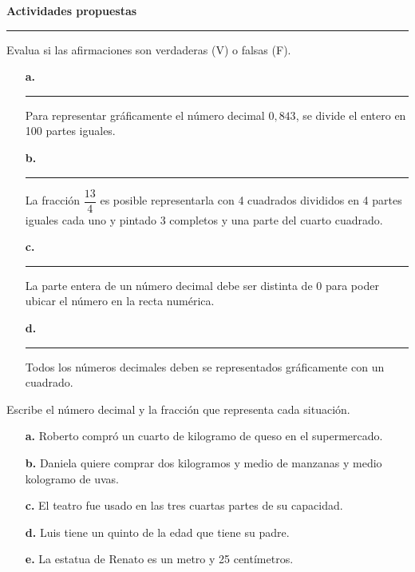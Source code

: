 \documentclass[spanish,letterpaper, 11pt, addpoints, answers]{exam}
\begin{document}
\parbox{6in}{
\textbf{Actividades propuestas}}
\vspace{0.15in}
\hrule 

\begin{questions}

\question Evalua si las afirmaciones son verdaderas (V) o falsas (F).

\begin{itemize}
  \item[\textbf{a.}] \rule{1cm}{0.4pt} Para representar gráficamente el número decimal $0{,}843$, se divide el entero en 100 partes iguales.
  \item[\textbf{b.}] \rule{1cm}{0.4pt} La fracción $\dfrac{13}{4}$ es posible representarla con 4 cuadrados divididos en 4 partes iguales cada uno y pintado 3 completos y una parte del cuarto cuadrado.
  \item[\textbf{c.}] \rule{1cm}{0.4pt} La parte entera de un número decimal debe ser distinta de 0 para poder ubicar el número en la recta numérica.
  \item[\textbf{d.}] \rule{1cm}{0.4pt} Todos los números decimales deben se representados gráficamente con un cuadrado.
\end{itemize}


\question Escribe el número decimal y la fracción que representa cada situación.

  \begin{itemize}
  \item[\textbf{a.}] Roberto compró un cuarto de kilogramo de queso en el supermercado.
  \item[\textbf{b.}] Daniela quiere comprar dos kilogramos y medio de manzanas y medio kologramo de uvas.
  \item[\textbf{c.}] El teatro fue usado en las tres cuartas partes de su capacidad.
  \item[\textbf{d.}] Luis tiene un quinto de la edad que tiene su padre.
  \item[\textbf{e.}] La estatua de Renato es un metro y 25 centímetros.
  \end{itemize}


\end{questions}
\end{document}
